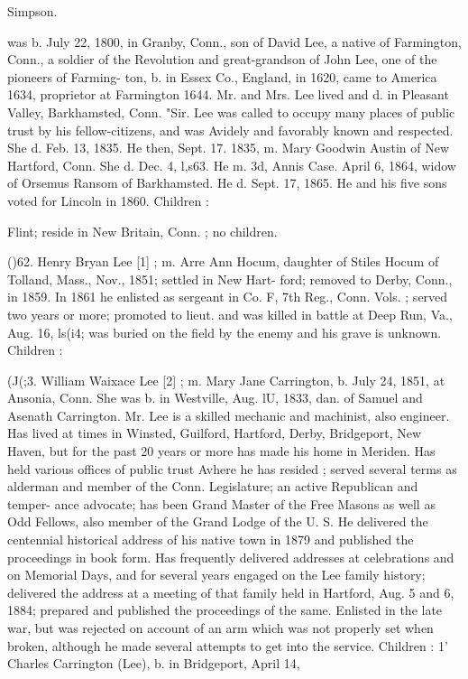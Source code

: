 \documentclass{book}
\begin{document}
Simpson. 







was b. July 22, 1800, in Granby, Conn., son of David Lee, a 
native of Farmington, Conn., a soldier of the Revolution and 
great-grandson of John Lee, one of the pioneers of Farming- 
ton, b. in Essex Co., England, in 1620, came to America 1634, 
proprietor at Farmington 1644. Mr. and Mrs. Lee lived and 
d. in Pleasant Valley, Barkhamsted, Conn. "Sir. Lee was called 
to occupy many places of public trust by his fellow-citizens, 
and was Avidely and favorably known and respected. She d. 
Feb. 13, 1835. He then, Sept. 17. 1835, m. Mary Goodwin 
Austin of New Hartford, Conn. She d. Dec. 4, l,s63. He m. 
3d, Annis Case. April 6, 1864, widow of Orsemus Ransom of 
Barkhamsted. He d. Sept. 17, 1865. He and his five sons 
voted for Lincoln in 1860. Children : 










Flint; reside in New Britain, Conn. ; no children. 

()62. Henry Bryan Lee [1] ; m. Arre Ann Hocum, daughter of Stiles 
Hocum of Tolland, Mass., Nov., 1851; settled in New Hart- 
ford; removed to Derby, Conn., in 1859. In 1861 he enlisted 
as sergeant in Co. F, 7th Reg., Conn. Vols. ; served two years 
or more; promoted to lieut. and was killed in battle at Deep 
Run, Va., Aug. 16, ls(i4; was buried on the field by the enemy 
and his grave is unknown. Children : 










(J(;3. William Waixace Lee [2] ; m. Mary Jane Carrington, b. July 
24, 1851, at Ansonia, Conn. She was b. in Westville, Aug. lU, 
1833, dan. of Samuel and Asenath Carrington. Mr. Lee is a 
skilled mechanic and machinist, also engineer. Has lived at 
times in Winsted, Guilford, Hartford, Derby, Bridgeport, New 
Haven, but for the past 20 years or more has made his home in 
Meriden. Has held various offices of public trust Avhere he 
has resided ; served several terms as alderman and member 
of the Conn. Legislature; an active Republican and temper- 
ance advocate; has been Grand Master of the Free Masons 
as well as Odd Fellows, also member of the Grand Lodge of 
the U. S. He delivered the centennial historical address of 
his native town in 1879 and published the proceedings in book 
form. Has frequently delivered addresses at celebrations and 
on Memorial Days, and for several years engaged on the Lee 
family history; delivered the address at a meeting of that 
family held in Hartford, Aug. 5 and 6, 1884; prepared and 
published the proceedings of the same. Enlisted in the late 
war, but was rejected on account of an arm which was not 
properly set when broken, although he made several attempts 
to get into the service. Children : 
1' Charles Carrington (Lee), b. in Bridgeport, April 14, 
\end{document}
